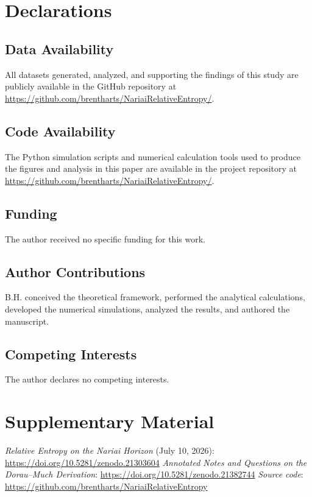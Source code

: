 \documentclass[11pt]{article}
\begin{document}
\section*{Declarations}

\subsection*{Data Availability}
All datasets generated, analyzed, and supporting the findings of this study are publicly available in the GitHub repository at \url{https://github.com/brentharts/NariaiRelativeEntropy/}.

\subsection*{Code Availability}
The Python simulation scripts and numerical calculation tools used to produce the figures and analysis in this paper are available in the project repository at \url{https://github.com/brentharts/NariaiRelativeEntropy/}.

\subsection*{Funding}
The author received no specific funding for this work.

\subsection*{Author Contributions}
B.H. conceived the theoretical framework, performed the analytical calculations, developed the numerical simulations, analyzed the results, and authored the manuscript.

\subsection*{Competing Interests}
The author declares no competing interests.

\appendix

\section{Supplementary Material}
\noindent \emph{Relative Entropy on the Nariai Horizon} (July 10, 2026): 
\newline \url{https://doi.org/10.5281/zenodo.21303604}
\newline
\emph{Annotated Notes and Questions on the Dorau--Much Derivation}: 
\newline
\url{https://doi.org/10.5281/zenodo.21382744}
\newline
\emph{Source code}: \url{https://github.com/brentharts/NariaiRelativeEntropy}
\end{document}
